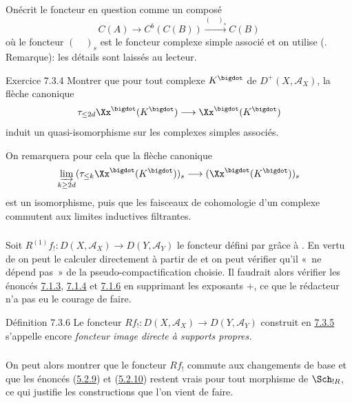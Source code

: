 \documentclass[10pt]{../fichiers-configuration-latex/smfart}
\begin{document}
On\pageoriginale écrit le foncteur en question comme un composé
\[
C(A)\longrightarrow C^{b}(C(B))\xrightarrow{(\quad)_{s}}C(B)
\]
où le foncteur $(\quad)_{s}$ est le foncteur complexe simple associé et
on utilise (. Remarque): les détails sont laissés au
lecteur.

\begin{enonce*}[remark]{Exercice 7.3.4}
Montrer que pour tout complexe $K^{\bigdot}$ de
$D^{+}(X,\mathcal{A}_{X})$, la flèche canonique
\[
\tau_{\leq 2d} \Xx^{\bigdot}(K^{\bigdot})\longrightarrow
\Xx^{\bigdot}(K^{\bigdot})
\]
induit un quasi-isomorphisme sur les complexes simples associés.
\end{enonce*}

On remarquera pour cela que la flèche canonique
\[
\varinjlim_{k\geq 2d} (\tau_{\leq k}
\Xx^{\bigdot}(K^{\bigdot}))_{s}\longrightarrow
(\Xx^{\bigdot}(K^{\bigdot}))_{s}
\]
est un isomorphisme, puis que les faisceaux de cohomologie d'un
complexe commutent aux limites inductives filtrantes.

\setcounter{subsubsection}{4}
\subsubsection{}
Soit $R^{(1)}f_{!}:D(X,\mathcal{A}_{X})\rightarrow
D(Y,\mathcal{A}_{Y})$ le foncteur défini par  grâce à
. En vertu de  on peut le calculer directement à partir de
 et on peut vérifier qu'il « ne dépend pas » de la
pseudo-compactification choisie. Il faudrait alors vérifier les
énoncés \hyperref[XVII.constru7.1.3]{7.1.3}, \hyperref[XVII.constru7.1.4]{7.1.4} et
\hyperref[XVII.prop7.1.6]{7.1.6} en supprimant les exposants $+$, ce que
le rédacteur n'a pas eu le courage de faire.

\begin{enonce*}{Définition 7.3.6}
Le foncteur $Rf_{!}:D(X,\mathcal{A}_{X})\rightarrow
D(Y,\mathcal{A}_{Y})$ construit en \hyperref[XVII.subsubsec7.3.5]{7.3.5} s'appelle encore
\emph{foncteur image directe à supports propres.}
\end{enonce*}

\setcounter{subsubsection}{6}
\subsubsection{}
On peut alors montrer que le foncteur $Rf_{!}$ commute aux changements
de base et que les énoncés (\hyperref[XVII.prop5.2.9]{5.2.9}) et
(\hyperref[XVII.thm5.2.10]{5.2.10}) restent vrais
pour tout morphisme de $\Sch_{!R}$, ce qui justifie les
constructions que l'on vient de faire.
\end{document}
